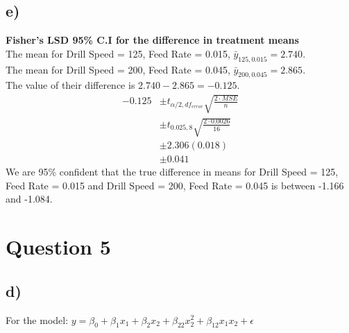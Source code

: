 \documentclass{article}
\begin{document}
\subsection*{e)}
\textbf{Fisher's LSD 95\% C.I for the difference in treatment means} \\
The mean for Drill Speed = 125, Feed Rate = 0.015, $\bar{y}_{125, 0.015} = 2.740$. \\
The mean for Drill Speed = 200, Feed Rate = 0.045, $\bar{y}_{200, 0.045} = 2.865$. \\
The value of their difference is $2.740 - 2.865 = -0.125$.
\begin{align*}
    -0.125 &\pm t_{\alpha/2, df_{error}} \sqrt{\frac{2 \cdot MSE}{n}} \\
           &\pm t_{0.025, 8} \sqrt{\frac{2 \cdot 0.0026}{16}} \\
           &\pm 2.306 (0.018) \\
           &\pm 0.041
\end{align*}
We are 95\% confident that the true difference in means for Drill Speed = 125, Feed Rate = 0.015 and Drill Speed = 200, Feed Rate = 0.045
is between -1.166 and -1.084.


\section*{Question 5}
\subsection*{d)}
For the model: $y = \beta_0 + \beta_1 x_1 + \beta_2 x_2 + \beta_{22} x^{2}_2 + \beta_{12} x_1 x_2 + \epsilon$
\end{document}
